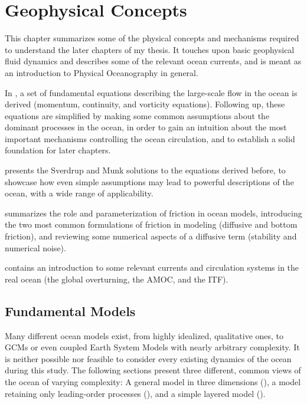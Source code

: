 \chapter{Geophysical Concepts}

This %
%
chapter summarizes some of the physical concepts and mechanisms required to understand the later chapters of my thesis. It touches upon basic geophysical fluid dynamics and describes some of the relevant ocean currents, and is meant as an introduction to Physical Oceanography in general.

In , a set of fundamental equations describing the large-scale flow in the ocean is derived (momentum, continuity, and vorticity equations). Following up, these equations are simplified by making some common assumptions about the dominant processes in the ocean, in order to gain an intuition about the most important mechanisms controlling the ocean circulation, and to establish a solid foundation for later chapters.

 presents the Sverdrup and Munk solutions to the equations derived before, to showcase how even simple assumptions may lead to powerful descriptions of the ocean, with a wide range of applicability.

 summarizes the role and parameterization of friction in ocean models, introducing the two most common formulations of friction in modeling (diffusive and bottom friction), and reviewing some numerical aspects of a diffusive term (stability and numerical noise).

 contains an introduction to some relevant currents and circulation systems in the real ocean (the global overturning, the \acl{AMOC}, and the \acl{ITF}).
 
\clearpage
\section{Fundamental Models}
\label{sec:physics-models}
Many %
%
different ocean models exist, from highly idealized, qualitative ones, to \acp{GCM} or even coupled Earth System Models with nearly arbitrary complexity. It is neither possible nor feasible to consider every existing dynamics of the ocean during this study. The following sections present three different, common views of the ocean of varying complexity: A general model in three dimensions (), a model retaining only leading-order processes (), and a simple layered model (). 

